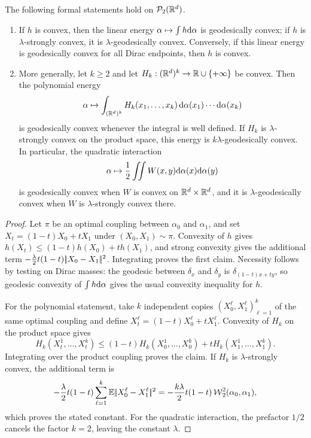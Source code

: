 \begin{prop}\label{prop-basic-geodesic-convexity}
	The following formal statements hold on $\mathcal{P}_2(\mathbb{R}^d)$.
	\begin{enumerate}
		\item If $h$ is convex, then the linear energy $\alpha\mapsto\int h\mathrm{d}\alpha$ is geodesically convex; if $h$ is $\lambda$-strongly convex, it is $\lambda$-geodesically convex. Conversely, if this linear energy is geodesically convex for all Dirac endpoints, then $h$ is convex.
		\item More generally, let \(k\geq2\) and let \(H_k:(\mathbb{R}^d)^k\to\mathbb{R}\cup\{+\infty\}\) be convex. Then the polynomial energy
		\[
			\alpha\mapsto \int_{(\mathbb{R}^d)^k} H_k(x_1,\ldots,x_k)\,\mathrm{d}\alpha(x_1)\cdots\mathrm{d}\alpha(x_k)
		\]
		is geodesically convex whenever the integral is well defined. If $H_k$ is $\lambda$-strongly convex on the product space, this energy is $k\lambda$-geodesically convex. In particular, the quadratic interaction
		\[
			\alpha\mapsto\frac12\iint W(x,y)\mathrm{d}\alpha(x)\mathrm{d}\alpha(y)
		\]
		is geodesically convex when \(W\) is convex on \(\mathbb{R}^d\times\mathbb{R}^d\), and it is $\lambda$-geodesically convex when $W$ is $\lambda$-strongly convex there.
	\end{enumerate}
\end{prop}
\begin{proof}
	Let \(\pi\) be an optimal coupling between \(\alpha_0\) and \(\alpha_1\), and set \(X_t=(1-t)X_0+tX_1\) under \((X_0,X_1)\sim\pi\). Convexity of \(h\) gives \(h(X_t)\leq(1-t)h(X_0)+t h(X_1)\), and strong convexity gives the additional term \(-\frac{\lambda}{2}t(1-t)|\!| X_0-X_1 |\!|^2\). Integrating proves the first claim. Necessity follows by testing on Dirac masses: the geodesic between \(\delta_x\) and \(\delta_y\) is \(\delta_{(1-t)x+ty}\), so geodesic convexity of \(\int h\mathrm{d}\alpha\) gives the usual convexity inequality for \(h\).

	For the polynomial statement, take \(k\) independent copies \((X_0^\ell,X_1^\ell)_{\ell=1}^k\) of the same optimal coupling and define \(X_t^\ell=(1-t)X_0^\ell+tX_1^\ell\). Convexity of \(H_k\) on the product space gives
	\[
		H_k(X_t^1,\ldots,X_t^k)
		\leq (1-t)H_k(X_0^1,\ldots,X_0^k)+tH_k(X_1^1,\ldots,X_1^k).
	\]
	Integrating over the product coupling proves the claim. If $H_k$ is $\lambda$-strongly convex, the additional term is
	\[
		-\frac{\lambda}{2}t(1-t)
		\sum_{\ell=1}^k\mathbb{E}|\!| X_0^\ell-X_1^\ell |\!|^2
		=
		-\frac{k\lambda}{2}t(1-t)\operatorname{\mathcal{W}}_2^2(\alpha_0,\alpha_1),
	\]
	which proves the stated constant. For the quadratic interaction, the prefactor $1/2$ cancels the factor $k=2$, leaving the constant $\lambda$.
\end{proof}

